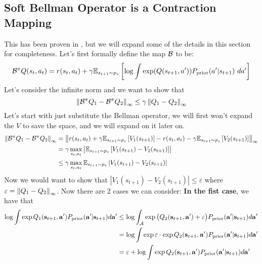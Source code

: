 \subsection{Soft Bellman Operator is a Contraction Mapping}
\label{appx:chap2-soft-bellman-contract}
This has been proven in \cite{haarnoja2017reinforcement}, but we will expand some of the details in this section for completeness. Let's first formally define the map $\mathcal{B}$ to be:
\begin{equation}
    \mathcal{B}^{\pi} Q(s_t, a_t) = r(s_t, a_t) + \gamma \mathbb{E}_{s_{t+1} \sim p_{s}}\left[ \log \int \exp(Q(s_{t+1}, a')) P_{\text{prior}}(a' | s_{t+1}) \ d a' \right]
\end{equation}
Let's consider the infinite norm and we want to show that 
\begin{equation}
    \left\lVert\mathcal{B}^{\pi} Q_1 - \mathcal{B}^{\pi} Q_2\right\rVert_{\infty}  \le \gamma \left\lVert Q_1 - Q_2\right\rVert_{\infty}
\end{equation}
Let's start with just substitute the Bellman operator, we will first won't expand the $V$ to save the space, and we will expand on it later on.
\begin{equation*}
    \begin{aligned}
        \left\lVert\mathcal{B}^{\pi} Q_1 - \mathcal{B}^{\pi} Q_2\right\rVert_{\infty} &= \left\lVert r(s_t, a_t) + \gamma \mathbb{E}_{s_{t+1} \sim p_{s}}\left[ V_1(s_{t+1}) \right] - r(s_t, a_t) - \gamma \mathbb{E}_{s_{t+1} \sim p_{s}}\left[ V_2(s_{t+1}) \right]\right\rVert_{\infty} \\
        &= \gamma \max_{s_t, a_t}\left|\mathbb{E}_{s_{t+1} \sim p_{s}}\left[ V_1(s_{t+1})- V_2(s_{t+1})\right] \right|\\
        &\le \gamma \max_{s_t, a_t}\mathbb{E}_{s_{t+1} \sim p_{s}} \left| V_1(s_{t+1})- V_2(s_{t+1}) \right|
    \end{aligned}
\end{equation*}
Now we would want to show that $\left| V_1(s_{t+1})- V_2(s_{t+1}) \right| \le \varepsilon$ where $\varepsilon = \left\lVert Q_1 - Q_2\right\rVert_{\infty}$. Now there are 2 cases we can consider: \textbf{In the fist case}, we have that 
\begin{equation*}
    \begin{aligned}
        \log \int \exp Q_1(\bold{s}_{t+1}, \bold{a}') P_{\text{prior}} (\bold{a}' | \bold{s}_{t+1}) d\bold{a}' &\le \log \int_{\mathcal{A}} \exp \big(Q_2(\bold{s}_{t+1}, \bold{a}') + \varepsilon \big) P_{\text{prior}} (\bold{a}' | \bold{s}_{t+1}) d\bold{a}' \\ 
        &= \log \int \exp \varepsilon \cdot \exp Q_2(\bold{s}_{t+1}, \bold{a}') P_{\text{prior}} (\bold{a}' | \bold{s}_{t+1}) d\bold{a}' \\ 
        &= \varepsilon + \log \int \exp Q_2(\bold{s}_{t+1}, \bold{a}')P_{\text{prior}} (\bold{a}' | \bold{s}_{t+1}) d\bold{a}'
    \end{aligned}
\end{equation*}
